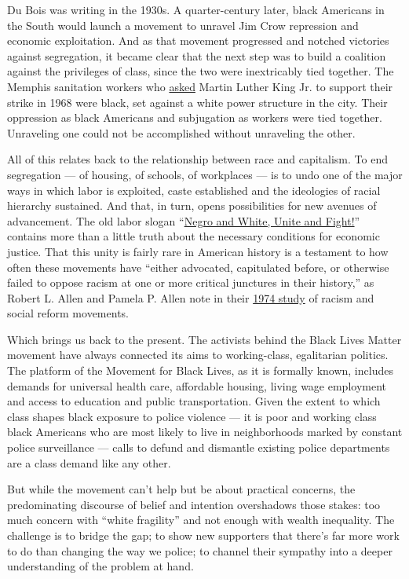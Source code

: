 Du Bois was writing in the 1930s. A quarter-century later, black
Americans in the South would launch a movement to unravel Jim Crow
repression and economic exploitation. And as that movement progressed
and notched victories against segregation, it became clear that the next
step was to build a coalition against the privileges of class, since the
two were inextricably tied together. The Memphis sanitation workers who
\href{https://www.vox.com/identities/2018/2/12/17004552/mlk-memphis-sanitation-strike-poor-peoples-campaign}{asked}
Martin Luther King Jr. to support their strike in 1968 were black, set
against a white power structure in the city. Their oppression as black
Americans and subjugation as workers were tied together. Unraveling one
could not be accomplished without unraveling the other.

All of this relates back to the relationship between race and
capitalism. To end segregation --- of housing, of schools, of workplaces
--- is to undo one of the major ways in which labor is exploited, caste
established and the ideologies of racial hierarchy sustained. And that,
in turn, opens possibilities for new avenues of advancement. The old
labor slogan
``\href{https://www.press.uillinois.edu/books/catalog/26nmf7cc9780252066214.html}{Negro
and White, Unite and Fight!}'' contains more than a little truth about
the necessary conditions for economic justice. That this unity is fairly
rare in American history is a testament to how often these movements
have ``either advocated, capitulated before, or otherwise failed to
oppose racism at one or more critical junctures in their history,'' as
Robert L. Allen and Pamela P. Allen note in their
\href{https://books.google.com/books/about/Reluctant_Reformers.html?id=Yfu_QgAACAAJ}{1974
study} of racism and social reform movements.

Which brings us back to the present. The activists behind the Black
Lives Matter movement have always connected its aims to working-class,
egalitarian politics. The platform of the Movement for Black Lives, as
it is formally known, includes demands for universal health care,
affordable housing, living wage employment and access to education and
public transportation. Given the extent to which class shapes black
exposure to police violence --- it is poor and working class black
Americans who are most likely to live in neighborhoods marked by
constant police surveillance --- calls to defund and dismantle existing
police departments are a class demand like any other.

But while the movement can't help but be about practical concerns, the
predominating discourse of belief and intention overshadows those
stakes: too much concern with ``white fragility'' and not enough with
wealth inequality. The challenge is to bridge the gap; to show new
supporters that there's far more work to do than changing the way we
police; to channel their sympathy into a deeper understanding of the
problem at hand.

